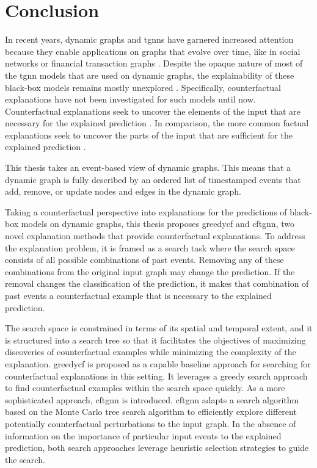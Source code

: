 \section{Conclusion}
\label{s_Conclusion}

In recent years, dynamic graphs and \glspl{tgnn} have garnered increased attention because they enable applications on graphs that evolve over time, like in social networks \cite{rossi_temporal_2020} or financial transaction graphs \cite{trivedi_dyrep_2019}. Despite the opaque nature of most of the \gls{tgnn} models that are used on dynamic graphs, the explainability of these black-box models remains mostly unexplored \cite{xia_explaining_2023}. Specifically, counterfactual explanations have not been investigated for such models until now. Counterfactual explanations seek to uncover the elements of the input that are necessary for the explained prediction \cite{tan_learning_2022}. In comparison, the more common factual explanations seek to uncover the parts of the input that are sufficient for the explained prediction \cite{tan_learning_2022}.

This thesis takes an event-based view of dynamic graphs. This means that a dynamic graph is fully described by an ordered list of timestamped events that add, remove, or update nodes and edges in the dynamic graph.

Taking a counterfactual perspective into explanations for the predictions of black-box models on dynamic graphs, this thesis proposes \gls{greedycf} and \gls{cftgnn}, two novel explanation methods that provide counterfactual explanations. To address the explanation problem, it is framed as a search task where the search space consists of all possible combinations of past events. Removing any of these combinations from the original input graph may change the prediction. If the removal changes the classification of the prediction, it makes that combination of past events a counterfactual example that is necessary to the explained prediction.

The search space is constrained in terms of its spatial and temporal extent, and it is structured into a search tree so that it facilitates the objectives of maximizing discoveries of counterfactual examples while minimizing the complexity of the explanation. \gls{greedycf} is proposed as a capable baseline approach for searching for counterfactual explanations in this setting. It leverages a greedy search approach to find counterfactual examples within the search space quickly. As a more sophisticated approach, \gls{cftgnn} is introduced. \gls{cftgnn} adapts a search algorithm based on the Monte Carlo tree search algorithm to efficiently explore different potentially counterfactual perturbations to the input graph. In the absence of information on the importance of particular input events to the explained prediction, both search approaches leverage heuristic selection strategies to guide the search.

